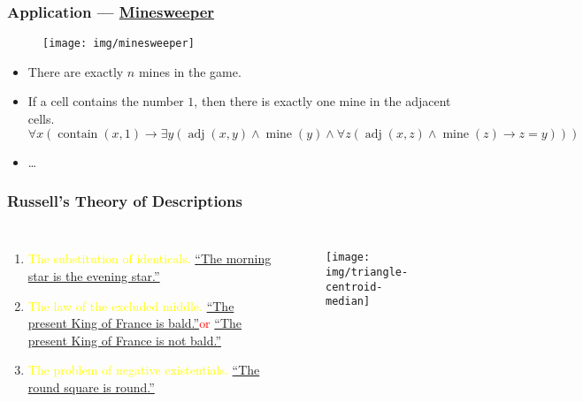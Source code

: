 \documentclass[UTF8,11pt,colorlinks,compress,openany]{beamer}%
\begin{document}
\begin{frame}\frametitle{Application --- \href{http://web.mat.bham.ac.uk/R.W.Kaye/minesw/}{Minesweeper}}\vspace{-5pt}
	\begin{figure}
		\texttt{[image: img/minesweeper]}
	\end{figure}\vspace{-7pt}
	\begin{itemize}
		\item There are exactly $n$ mines in the game.
		\item If a cell contains the number $1$, then there is exactly one mine in the adjacent cells.\\
		$\forall x(\operatorname{contain}(x,1)\to\exists y(\operatorname{adj}(x,y)\wedge \operatorname{mine}(y)\wedge\forall z(\operatorname{adj}(x,z)\wedge \operatorname{mine}(z)\to z=y)))$
		\item \dots
	\end{itemize}
\end{frame}

\begin{frame}\frametitle{Russell's Theory of Descriptions}
\begin{columns}
\begin{enumerate}
	\item \textcolor{yellow}{The substitution of identicals.}
	\underline{``The morning star is the evening star.''}
	\item \textcolor{yellow}{The law of the excluded middle.}
	\underline{``The present King of France is bald.''}\;\;\textcolor{red}{or}
	\underline{``The present King of France is not bald.''}
	\item \textcolor{yellow}{The problem of negative existentials.}
	\underline{``The round square is round.''}
\end{enumerate}
\begin{figure}
\texttt{[image: img/triangle-centroid-median]}
\end{figure}
\end{columns}
\end{frame}
\end{document}
